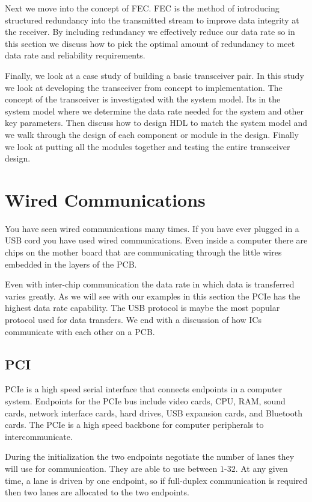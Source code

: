 Next we move into the concept of \ac{FEC}. \ac{FEC} is the method of introducing structured redundancy into the transmitted stream to improve data integrity at the receiver. By including redundancy we effectively reduce our data rate so in this section we discuss how to pick the optimal amount of redundancy to meet data rate and reliability requirements.

Finally, we look at a case study of building a basic transceiver pair. In this study we look at developing the transceiver from concept to implementation. The concept of the transceiver is investigated with the system model. Its in the system model where we determine the data rate needed for the system and other key parameters. Then discuss how to design \ac{HDL} to match the system model and we walk through the design of each component or module in the design. Finally we look at putting all the modules together and testing the entire transceiver design. 

\section{Wired Communications}

You have seen wired communications many times. If you have ever plugged in a \ac{USB} cord you have used wired communications. Even inside a computer there are chips on the mother board that are communicating through the little wires embedded in the layers of the \ac{PCB}.	
	
Even with inter-chip communication the data rate in which data is transferred varies greatly. As we will see with our examples in this section the \ac{PCIe} has the highest data rate capability. The \ac{USB} protocol is maybe the most popular protocol used for data transfers. We end with a discussion of how \ac{IC}s communicate with each other on a \ac{PCB}.
	
\subsection{PCI}

\ac{PCIe} is a high speed serial interface that connects endpoints in a computer system. Endpoints for the \ac{PCIe} bus include video cards, \ac{CPU}, \ac{RAM}, sound cards, network interface cards, hard drives, \ac{USB} expansion cards, and Bluetooth cards. The \ac{PCIe} is a high speed backbone for computer peripherals to intercommunicate. \cite{pcieref}	
	
During the initialization the two endpoints negotiate the number of lanes they will use for communication. They are able to use between $1$-$32$. At any given time, a lane is driven by one endpoint, so if full-duplex communication is required then two lanes are allocated to the two endpoints.

